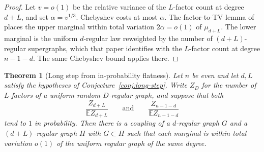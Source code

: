 \documentclass[11pt]{article}
\newtheorem{theorem}{Theorem}
\newcommand{\EE}{\mathbb{E}}
\begin{document}
\begin{proof}
Let \(v=o(1)\) be the relative variance of the \(L\)-factor count at degree
\(d+L\), and set \(\alpha=v^{1/3}\).
Chebyshev costs at most \(\alpha\).
The factor-to-TV lemma of~\cite{PlusOneV1} places the upper marginal within
total variation \(2\alpha=o(1)\) of \(\mu_{d+L}\).
The lower marginal is the uniform \(d\)-regular law reweighted by the number of
\((d+L)\)-regular supergraphs, which that paper identifies with the \(L\)-factor
count at degree \(n-1-d\).
The same Chebyshev bound applies there.
\end{proof}

\begin{theorem}[Long step from in-probability flatness]
\label{thm:long-from-flat}
Let \(n\) be even and let \(d,L\) satisfy the hypotheses of
Conjecture~\ref{conj:long-step}.
Write \(Z_D\) for the number of \(L\)-factors of a uniform random \(D\)-regular
graph, and suppose that both
\[
\frac{Z_{d+L}}{\EE Z_{d+L}}
\qquad\text{and}\qquad
\frac{Z_{n-1-d}}{\EE Z_{n-1-d}}
\]
tend to \(1\) in probability.
Then there is a coupling of a \(d\)-regular graph \(G\) and a \((d+L)\)-regular
graph \(H\) with \(G\subset H\) such that each marginal is within total variation
\(o(1)\) of the uniform regular graph of the same degree.
\end{theorem}
\end{document}
